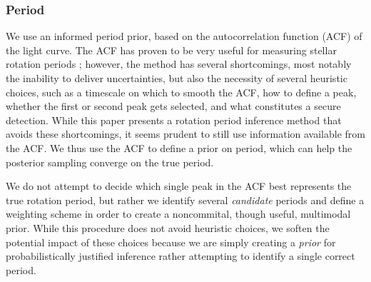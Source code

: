 \documentclass[a4paper,fleqn,usenatbib,useAMS]{mnras}
\begin{document}

\subsubsection{Period}
\label{sec:period_prior}

We use an informed period prior, based on the autocorrelation function (ACF)
of the light curve.
The ACF has proven to be very useful for measuring stellar rotation periods
\citep{Mcquillan2012, Mcquillan13b, Mcquillan2014}; however, the
method has several shortcomings,
most notably the inability to deliver uncertainties, but also
the necessity of several heuristic choices,
such as a timescale on which to smooth the ACF,
how to define a peak, whether the first or second peak
gets selected, and what constitutes a secure detection.
While this paper presents a rotation period inference method
that avoids these shortcomings,
it seems prudent to still use information available from the ACF.
We thus use the ACF to define a prior on period,
which can help the posterior sampling converge on the true period.

We do not attempt to decide which single
peak in the ACF best represents the true rotation period,
but rather we identify several \emph{candidate} periods and define
a weighting scheme in order to create a noncommital, though useful,
multimodal prior.  While this procedure does not avoid heuristic choices,
we soften the potential impact of these choices because we are simply
creating a \emph{prior} for probabilistically justified
inference rather attempting to identify a single correct period.
\end{document}
